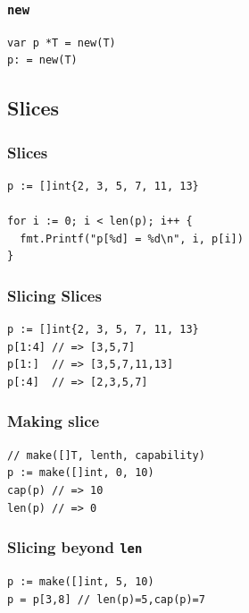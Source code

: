 \documentclass[xetex,mathserif,serif,12pt]{beamer}
\begin{document}
\begin{frame}[fragile]
  \frametitle{\texttt{new}}

  \begin{beamer@nomargin}
    \begin{lstlisting}
var p *T = new(T)
p: = new(T)
    \end{lstlisting}
  \end{beamer@nomargin}
\end{frame}

\subsection{Slices}

\begin{frame}[fragile]
  \frametitle{Slices}

  \begin{beamer@nomargin}
    \begin{lstlisting}
p := []int{2, 3, 5, 7, 11, 13}

for i := 0; i < len(p); i++ {
  fmt.Printf("p[%d] = %d\n", i, p[i])
}
    \end{lstlisting}
  \end{beamer@nomargin}
\end{frame}

\begin{frame}[fragile]
  \frametitle{Slicing Slices}

  \begin{beamer@nomargin}
    \begin{lstlisting}
p := []int{2, 3, 5, 7, 11, 13}
p[1:4] // => [3,5,7]
p[1:]  // => [3,5,7,11,13]
p[:4]  // => [2,3,5,7]
    \end{lstlisting}
  \end{beamer@nomargin}
\end{frame}

\begin{frame}[fragile]
  \frametitle{Making slice}

  \begin{beamer@nomargin}
    \begin{lstlisting}
// make([]T, lenth, capability)
p := make([]int, 0, 10)
cap(p) // => 10
len(p) // => 0
    \end{lstlisting}
  \end{beamer@nomargin}
\end{frame}

\begin{frame}[fragile]
  \frametitle{Slicing beyond \texttt{len}}

  \begin{beamer@nomargin}
    \begin{lstlisting}
p := make([]int, 5, 10)
p = p[3,8] // len(p)=5,cap(p)=7
    \end{lstlisting}
  \end{beamer@nomargin}
\end{frame}
\end{document}
